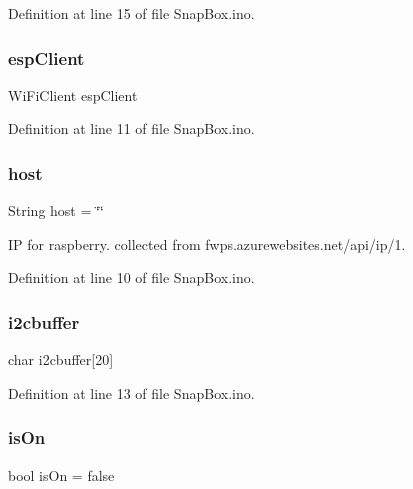 Definition at line 15 of file Snap\+Box.\+ino.

\mbox{\label{_snap_box_8ino_abd77e757e4b3bb6f1e4b42b21ea9e040}} 
\subsubsection{\texorpdfstring{esp\+Client}{espClient}}
{\footnotesize\ttfamily Wi\+Fi\+Client esp\+Client}



Definition at line 11 of file Snap\+Box.\+ino.

\mbox{\label{_snap_box_8ino_a2502b12b30261ef4dea2ff97a6b78cab}} 
\subsubsection{\texorpdfstring{host}{host}}
{\footnotesize\ttfamily String host = \char`\"{}\char`\"{}}



IP for raspberry. collected from fwps.\+azurewebsites.\+net/api/ip/1. 



Definition at line 10 of file Snap\+Box.\+ino.

\mbox{\label{_snap_box_8ino_affaea6d4a4cbfa87671e2929922c3d77}} 
\subsubsection{\texorpdfstring{i2cbuffer}{i2cbuffer}}
{\footnotesize\ttfamily char i2cbuffer\mbox{[}20\mbox{]}}



Definition at line 13 of file Snap\+Box.\+ino.

\mbox{\label{_snap_box_8ino_ae530c5af75c42fc2bd1fb588c38aa332}} 
\subsubsection{\texorpdfstring{is\+On}{isOn}}
{\footnotesize\ttfamily bool is\+On = false}



